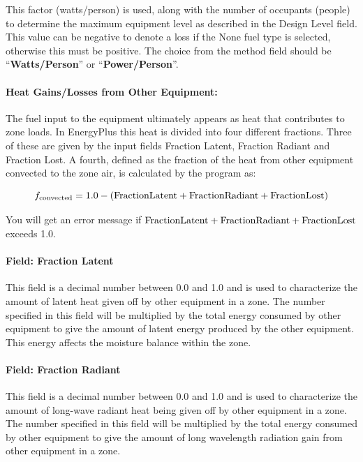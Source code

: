 This factor (watts/person) is used, along with the number of occupants (people) to determine the maximum equipment level as described in the Design Level field. This value can be negative to denote a loss if the None fuel type is selected, otherwise this must be positive. The choice from the method field should be ``\textbf{Watts/Person}'' or ``\textbf{Power/Person}''.

\paragraph{Heat Gains/Losses from Other Equipment:}\label{heat-gainslosses-from-other-equipment}

The fuel input to the equipment ultimately appears as heat that contributes to zone loads. In EnergyPlus this heat is divided into four different fractions. Three of these are given by the input fields Fraction Latent, Fraction Radiant and Fraction Lost. A fourth, defined as the fraction of the heat from other equipment convected to the zone air, is calculated by the program as:

\begin{equation}
  f_{\rm{convected}} = 1.0 - (\rm{Fraction Latent} + \rm{Fraction Radiant} + \rm{Fraction Lost})
\end{equation}

You will get an error message if \(\rm{Fraction Latent} + \rm{Fraction Radiant} + \rm{Fraction Lost}\) exceeds 1.0.

\paragraph{Field: Fraction Latent}\label{field-fraction-latent-4}

This field is a decimal number between 0.0 and 1.0 and is used to characterize the amount of latent heat given off by other equipment in a zone. The number specified in this field will be multiplied by the total energy consumed by other equipment to give the amount of latent energy produced by the other equipment. This energy affects the moisture balance within the zone.

\paragraph{Field: Fraction Radiant}\label{field-fraction-radiant-6}

This field is a decimal number between 0.0 and 1.0 and is used to characterize the amount of long-wave radiant heat being given off by other equipment in a zone. The number specified in this field will be multiplied by the total energy consumed by other equipment to give the amount of long wavelength radiation gain from other equipment in a zone.

